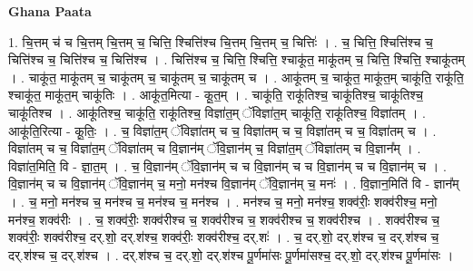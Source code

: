 \documentclass[17pt]{extarticle}
\begin{document}
\textbf{Ghana Paata } \newline

1. चि॒त्तम् च॑ च चि॒त्तम् चि॒त्तम् च॒ चित्ति॒ श्चित्ति॑श्च चि॒त्तम् चि॒त्तम् च॒ चित्तिः॑ । . च॒ चित्ति॒ श्चित्ति॑श्च च॒ चित्ति॑श्च च॒ चित्ति॑श्च च॒ चित्ति॑श्च । . चित्ति॑श्च च॒ चित्ति॒ श्चित्ति॒ श्चाकू॑त॒ माकू॑तम् च॒ चित्ति॒ श्चित्ति॒ श्चाकू॑तम् । . चाकू॑त॒ माकू॑तम् च॒ चाकू॑तम् च॒ चाकू॑तम् च॒ चाकू॑तम् च । . आकू॑तम् च॒ चाकू॑त॒ माकू॑त॒म् चाकू॑ति॒ राकू॑ति॒ श्चाकू॑त॒ माकू॑त॒म् चाकू॑तिः । . आकू॑त॒मित्या - कू॒त॒म् । . चाकू॑ति॒ राकू॑तिश्च॒ चाकू॑तिश्च॒ चाकू॑तिश्च॒ चाकू॑तिश्च । . आकू॑तिश्च॒ चाकू॑ति॒ राकू॑तिश्च॒ विज्ञा॑त॒म् ॅविज्ञा॑त॒म् चाकू॑ति॒ राकू॑तिश्च॒ विज्ञा॑तम् । . आकू॑ति॒रित्या - कू॒तिः॒ । . च॒ विज्ञा॑त॒म् ॅविज्ञा॑तम् च च॒ विज्ञा॑तम् च च॒ विज्ञा॑तम् च च॒ विज्ञा॑तम् च । . विज्ञा॑तम् च च॒ विज्ञा॑त॒म् ॅविज्ञा॑तम् च वि॒ज्ञान॑म् ॅवि॒ज्ञान॑म् च॒ विज्ञा॑त॒म् ॅविज्ञा॑तम् च वि॒ज्ञान᳚म् । . विज्ञा॑त॒मिति॒ वि - ज्ञा॒त॒म् । . च॒ वि॒ज्ञान॑म् ॅवि॒ज्ञान॑म् च च वि॒ज्ञान॑म् च च वि॒ज्ञान॑म् च च वि॒ज्ञान॑म् च । . वि॒ज्ञान॑म् च च वि॒ज्ञान॑म् ॅवि॒ज्ञान॑म् च॒ मनो॒ मन॑श्च वि॒ज्ञान॑म् ॅवि॒ज्ञान॑म् च॒ मनः॑ । . वि॒ज्ञान॒मिति॑ वि - ज्ञान᳚म् । . च॒ मनो॒ मन॑श्च च॒ मन॑श्च च॒ मन॑श्च च॒ मन॑श्च । . मन॑श्च च॒ मनो॒ मन॑श्च॒ शक्व॑रीः॒ शक्व॑रीश्च॒ मनो॒ मन॑श्च॒ शक्व॑रीः । . च॒ शक्व॑रीः॒ शक्व॑रीश्च च॒ शक्व॑रीश्च च॒ शक्व॑रीश्च च॒ शक्व॑रीश्च । . शक्व॑रीश्च च॒ शक्व॑रीः॒ शक्व॑रीश्च॒ दर्.शो॒ दर्.श॑श्च॒ शक्व॑रीः॒ शक्व॑रीश्च॒ दर्.शः॑ । . च॒ दर्.शो॒ दर्.श॑श्च च॒ दर्.श॑श्च च॒ दर्.श॑श्च च॒ दर्.श॑श्च । . दर्.श॑श्च च॒ दर्.शो॒ दर्.श॑श्च पू॒र्णमा॑सः पू॒र्णमा॑सश्च॒ दर्.शो॒ दर्.श॑श्च पू॒र्णमा॑सः । \newline
\end{document}
